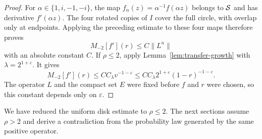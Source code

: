 \begin{proof}
For $\alpha\in\{1,i,-1,-i\}$, the map
$f_\alpha(z)=\alpha^{-1}f(\alpha z)$ belongs to $\mathcal S$ and has derivative
$f'(\alpha z)$.  The four rotated copies of $I$ cover the full circle,
with overlap only at endpoints.  Applying the preceding estimate to
these four maps therefore proves
\[
 M_{-2}[f'](r)\le C\|L^n\|
\]
with an absolute constant $C$.  If $\rho\le2$, apply
Lemma~\ref{lem:transfer-growth} with $\lambda=2^{1+\varepsilon}$.
It gives
\[
 M_{-2}[f'](r)\le C C_\lambda v^{-1-\varepsilon}
 \le C C_\lambda 2^{1+\varepsilon}(1-r)^{-1-\varepsilon}.
\]
The operator $L$ and the compact set $E$ were fixed before $f$ and $r$
were chosen, so this constant depends only on $\varepsilon$.
\end{proof}

We have reduced the uniform disk estimate to $\rho\le2$.  The next
sections assume $\rho>2$ and derive a contradiction from the probability
law generated by the same positive operator.
